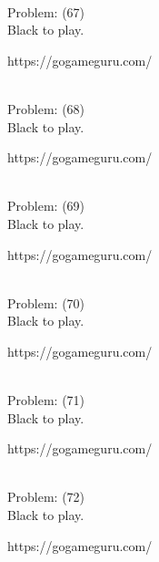 \documentclass[11pt]{article}
\begin{document}
\begin{minipage}[t]{0.5\textwidth}
  {\centering
  
\\
  Problem: (67)\\
  Black to play.

https://gogameguru.com/\\
  }
\end{minipage}
\begin{minipage}[t]{0.5\textwidth}
  {\centering
  
\\
  Problem: (68)\\
  Black to play.

https://gogameguru.com/\\
  }
\end{minipage}
\begin{minipage}[t]{0.5\textwidth}
  {\centering
  
\\
  Problem: (69)\\
  Black to play.

https://gogameguru.com/\\
  }
\end{minipage}
\begin{minipage}[t]{0.5\textwidth}
  {\centering
  
\\
  Problem: (70)\\
  Black to play.

https://gogameguru.com/\\
  }
\end{minipage}
\begin{minipage}[t]{0.5\textwidth}
  {\centering
  
\\
  Problem: (71)\\
  Black to play.

https://gogameguru.com/\\
  }
\end{minipage}
\begin{minipage}[t]{0.5\textwidth}
  {\centering
  
\\
  Problem: (72)\\
  Black to play.

https://gogameguru.com/\\
  }
\end{minipage}
\end{document}
